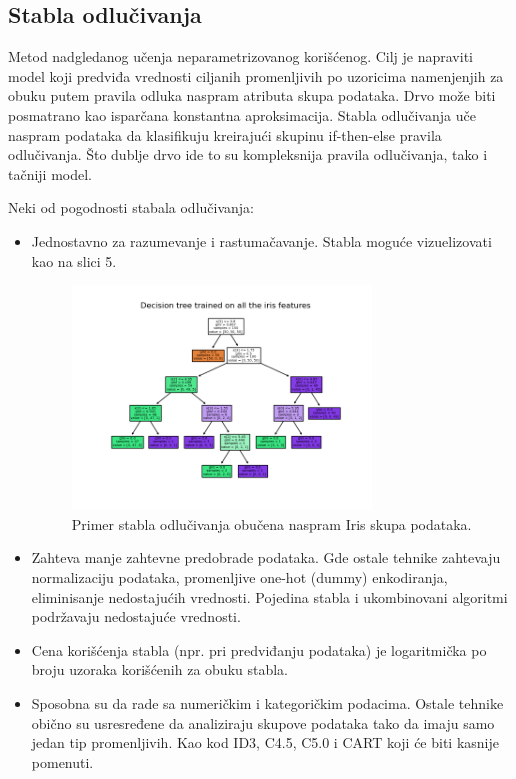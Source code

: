 \documentclass[fontsize=12bp, paper=a4]{scrarticle}
\begin{document}
\subsection{Stabla odlučivanja}
Metod nadgledanog učenja neparametrizovanog korišćenog.\cite{dtrees} Cilj je napraviti model koji predviđa vrednosti ciljanih promenljivih po uzoricima namenjenjih za obuku putem pravila odluka naspram atributa skupa podataka. Drvo može biti posmatrano kao isparčana konstantna aproksimacija. Stabla odlučivanja uče naspram podataka da klasifikuju kreirajući skupinu if-then-else pravila odlučivanja. Što dublje drvo ide to su kompleksnija pravila odlučivanja, tako i tačniji model. 


Neki od pogodnosti stabala odlučivanja:
\begin{itemize}
    \item Jednostavno za razumevanje i rastumačavanje. Stabla moguće vizuelizovati kao na slici 5.
    \begin{figure}[h!]
        \centering
        \includegraphics[width=0.75\textwidth]{image-3.png}
        \caption{Primer stabla odlučivanja obučena naspram Iris skupa podataka.}
    \end{figure}
    \item Zahteva manje zahtevne predobrade podataka. Gde ostale tehnike zahtevaju normalizaciju podataka, promenljive one-hot (dummy) enkodiranja, eliminisanje nedostajućih vrednosti. Pojedina stabla i ukombinovani algoritmi podržavaju nedostajuće vrednosti.
    \item Cena korišćenja stabla (npr. pri predviđanju podataka) je logaritmička po broju uzoraka korišćenih za obuku stabla.
    \item Sposobna su da rade sa numeričkim i kategoričkim podacima. Ostale tehnike obično su usresređene da analiziraju skupove podataka tako da imaju samo jedan tip promenljivih. Kao kod ID3, C4.5, C5.0 i CART koji će biti kasnije pomenuti. 

\end{itemize}
\end{document}
